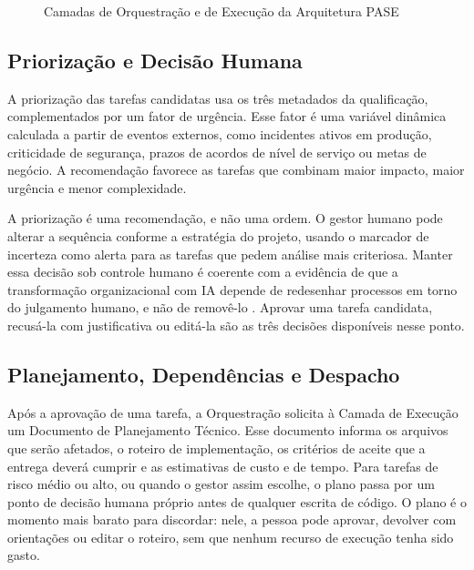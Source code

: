 \begin{figure}[htb]
\centering
\caption{Camadas de Orquestração e de Execução da Arquitetura PASE}
\label{fig:4}
\end{figure}

\subsection{Priorização e Decisão Humana}\label{sec:4.4.1}

A priorização das tarefas candidatas usa os três metadados da qualificação, complementados por um fator de urgência. Esse fator é uma variável dinâmica calculada a partir de eventos externos, como incidentes ativos em produção, criticidade de segurança, prazos de acordos de nível de serviço ou metas de negócio. A recomendação favorece as tarefas que combinam maior impacto, maior urgência e menor complexidade.

A priorização é uma recomendação, e não uma ordem. O gestor humano pode alterar a sequência conforme a estratégia do projeto, usando o marcador de incerteza como alerta para as tarefas que pedem análise mais criteriosa. Manter essa decisão sob controle humano é coerente com a evidência de que a transformação organizacional com IA depende de redesenhar processos em torno do julgamento humano, e não de removê-lo \cite{wef2026organizational}. Aprovar uma tarefa candidata, recusá-la com justificativa ou editá-la são as três decisões disponíveis nesse ponto.

\subsection{Planejamento, Dependências e Despacho}\label{sec:4.4.2}

Após a aprovação de uma tarefa, a Orquestração solicita à Camada de Execução um Documento de Planejamento Técnico. Esse documento informa os arquivos que serão afetados, o roteiro de implementação, os critérios de aceite que a entrega deverá cumprir e as estimativas de custo e de tempo. Para tarefas de risco médio ou alto, ou quando o gestor assim escolhe, o plano passa por um ponto de decisão humana próprio antes de qualquer escrita de código. O plano é o momento mais barato para discordar: nele, a pessoa pode aprovar, devolver com orientações ou editar o roteiro, sem que nenhum recurso de execução tenha sido gasto.


